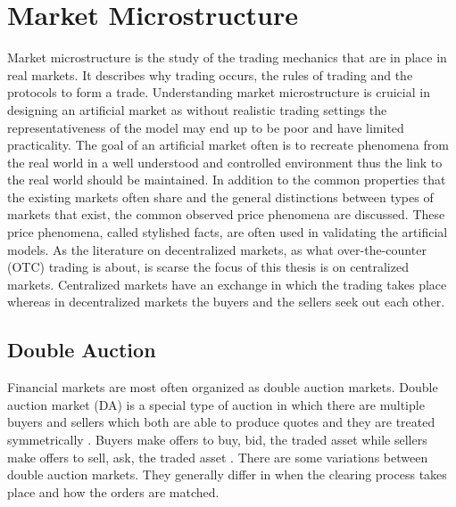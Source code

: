 \section{Market Microstructure}

Market microstructure is the study of the trading mechanics that are in place 
in real markets. It describes why trading occurs, the rules of trading 
and the protocols to form a trade. \citep[p. 3-4]{Has07}
Understanding market microstructure is cruicial in designing an artificial market
as without realistic trading settings the representativeness of the model may end
up to be poor and have limited practicality. The goal of an artificial market often
is to recreate phenomena from the real world in a well understood and controlled 
environment thus the link to the real world should be maintained. In addition to the
common properties that the existing markets often share and the general distinctions between
types of markets that exist, the common observed price phenomena are discussed. These 
price phenomena, called stylished facts, are often used in validating the artificial models.
As the literature on decentralized markets, as what over-the-counter (OTC) trading is about,
is scarse the focus of this thesis is on centralized markets. Centralized markets have an 
exchange in which the trading takes place whereas in decentralized markets the buyers and 
the sellers seek out each other.


\subsection{Double Auction}

Financial markets are most often organized as double auction markets.
Double auction market (DA) is a special type of auction in which there
are multiple buyers and sellers which both are able to 
produce quotes and they are treated symmetrically \citep*{Kle99}. Buyers
make offers to buy, bid, the traded asset while sellers make offers
to sell, ask, the traded asset \citep*{Moc15}. There are some variations 
between double auction markets. They generally differ in when the clearing process takes place 
and how the orders are matched. 

